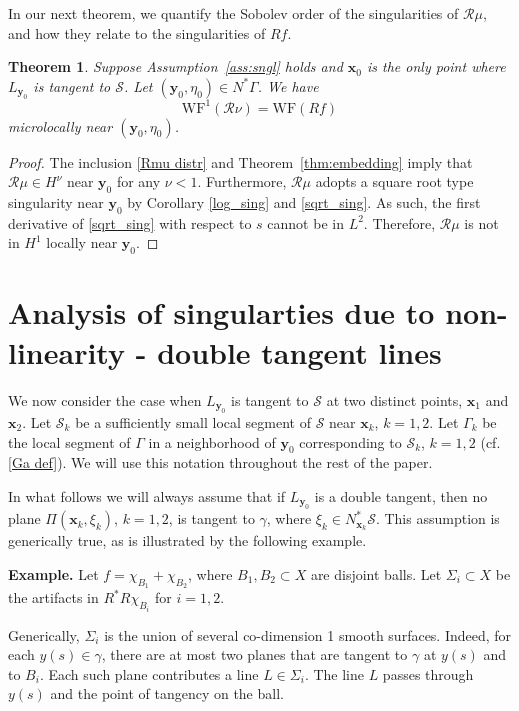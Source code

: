 \documentclass[11pt]{article}
\newcommand{\be}{\begin{equation}}
\newcommand{\ee}{\end{equation}}
\newcommand{\s}{\mathcal S}
\newcommand{\WF}{\mathrm{WF}}
\newcommand{\ga}{\gamma}
\def\red#1{\textcolor[rgb]{1, 0, 0}{#1} }
\numberwithin{equation}{section}
\newcommand{\vy}{\mathbf{y}}
\newcommand{\vx}{\mathbf{x}}
\newtheorem{theorem}{Theorem}[section]
\theoremstyle{definition}
\begin{document}
In our next theorem, we quantify the Sobolev order of the singularities of $\mathcal{R}\mu$, and how they relate to the singularities of $Rf$. 

\begin{theorem}\label{WF_thm}
Suppose Assumption~\ref{ass:sngl} holds and $\vx_0$ is the only point where $L_{\vy_0}$ is tangent to $\s$. Let $(\vy_0,\eta_0)\in N^*\Gamma$. We have
\be
\WF^1(\mathcal{R}\nu) = \WF(Rf)
\ee
microlocally near $(\vy_0,\eta_0)$. 
\end{theorem}

\begin{proof}
The inclusion \eqref{Rmu distr} and Theorem~\ref{thm:embedding} imply that $\mathcal{R}\mu\in H^\nu$ near $\vy_0$ for any $\nu<1$. Furthermore, $\mathcal{R}\mu$ adopts a square root type singularity near $\vy_0$ by Corollary \ref{log_sing} and \eqref{sqrt_sing}. As such, the first derivative of \eqref{sqrt_sing} with respect to $s$ cannot be in $L^2$. Therefore, $\mathcal{R}\mu$ is not in $H^1$ locally near $\vy_0$. \end{proof}

\section{Analysis of singularties due to non-linearity - double tangent lines}\label{sec:dbl tang}
We now consider the case when $L_{\vy_0}$ is tangent to $\s$ at two distinct points, $\vx_1$ and $\vx_2$. Let $\s_k$ be a sufficiently small local segment of $\s$ near $\vx_k$, $k=1,2$. Let $\Gamma_k$ be the local segment of $\Gamma$ in a neighborhood of $\vy_0$ corresponding to $\s_k$, $k=1,2$ (cf. \eqref{Ga def}). We will use this notation throughout the rest of the paper. 


In what follows we will always assume that if $L_{\vy_0}$ is a double tangent, then no plane $\Pi(\vx_k,\xi_k)$, $k=1,2$, is tangent to $\ga$, where $\xi_k\in N_{\vx_k}^*\s$. This assumption is generically true, as is illustrated by the following example.\vspace{2mm}

\noindent
{\bf Example.} Let $f = \chi_{B_1} + \chi_{B_2}$, where $B_1,B_2 \subset X$ are disjoint balls. 
Let $\Sigma_i\subset X$ be the artifacts in $R^*R \chi_{B_i}$ for $i = 1,2$. 

Generically, $\Sigma_i$ is the union of several co-dimension 1 smooth surfaces. Indeed, for each $y(s)\in\ga$, there are at most two planes that are tangent to $\ga$ at $y(s)$ and to $B_i$. Each such plane contributes a line $L\in \Sigma_i$. The line $L$ passes through $y(s)$ and the point of tangency on the ball.
\end{document}
